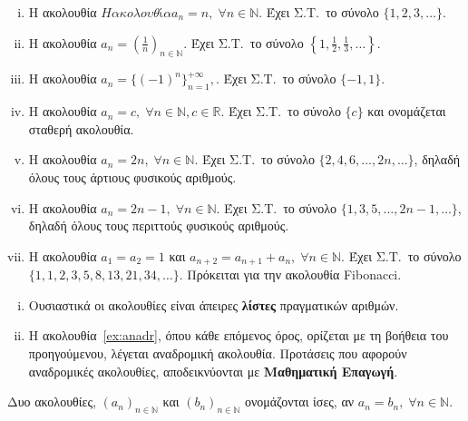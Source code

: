 \begin{examples}
\item {}
  \begin{enumerate}[i)]
    \item Η ακολουθία $ Η ακολουθία a_{n} = n, \; \forall n \in \mathbb{N} $. 
      Έχει Σ.Τ.\  το σύνολο $  \{ 1,2,3, \ldots \} $.
    \item Η ακολουθία $ a_{n}=\left(\frac{1}{n}\right)_{n \in \mathbb{N}} $. 
      Έχει Σ.Τ.\ το σύνολο $  \left\{ 1, \frac{1}{2}, \frac{1}{3}, \ldots \right\} $.
    \item Η ακολουθία $ a_{n}= \{(-1)^{n}\}_{n=1}^{+ \infty}, $. Έχει Σ.Τ.\ 
      το σύνολο $ \{ -1,1 \} $.
    \item Η ακολουθία $ a_{n} = c, \; \forall n \in \mathbb{N}, c \in \mathbb{R} $.
      Έχει Σ.Τ.\ το σύνολο $ \{ c \} $ και ονομάζεται 
      \textcolor{Col1}{σταθερή ακολουθία}.
    \item Η ακολουθία $ a_{n}=2n, \; \forall n \in \mathbb{N} $. Έχει Σ.Τ.\ το 
      σύνολο $ \{ 2,4,6, \ldots, 2n, \ldots \} $, δηλαδή όλους τους
      \textcolor{Col1}{άρτιους} φυσικούς αριθμούς.
    \item Η ακολουθία $ a_{n}= 2n-1, \; \forall n \in \mathbb{N} $. Έχει Σ.Τ.\ το 
      σύνολο $ \{ 1,3,5, \ldots, 2n-1, \ldots \} $, δηλαδή όλους τους περιττούς
      φυσικούς αριθμούς.
    \item \label{ex:anadr} Η ακολουθία $ a_{1}= a_{2} = 1 $ και $ a_{n+2}=a_{n+1}
      +a_{n}, \; \forall n \in \mathbb{N}$. Έχει Σ.Τ.\ το σύνολο 
      $ \{ 1,1,2,3,5,8, 13,21,34, \ldots\} $.  Πρόκειται για την 
      \textcolor{Col1}{ακολουθία Fibonacci}. 
  \end{enumerate}
\end{examples}

\begin{rem}
\item {}
  \begin{enumerate}[i)]
    \item Ουσιαστικά οι ακολουθίες είναι άπειρες \textbf{λίστες} πραγματικών αριθμών.
    \item Η ακολουθία~\ref{ex:anadr}, όπου κάθε επόμενος όρος, ορίζεται με 
      τη βοήθεια του προηγούμενου, λέγεται
      \textcolor{Col1}{αναδρομική ακολουθία}.  Προτάσεις που αφορούν 
      αναδρομικές ακολουθίες, αποδεικνύονται με \textbf{Μαθηματική Επαγωγή}.
  \end{enumerate}
\end{rem}

\begin{mybox1}
  \begin{dfn}
    Δυο ακολουθίες, $(a_{n})_{n \in \mathbb{N}}$  και $ (b_{n})_{n \in \mathbb{N}} $ 
    ονομάζονται \textcolor{Col1}{ίσες}, αν 
    $ a_{n} = b_{n}, \; \forall n \in \mathbb{N} $.
  \end{dfn}
\end{mybox1}

